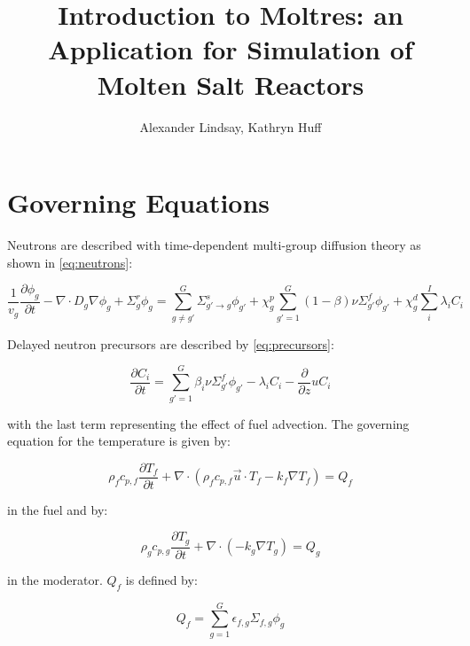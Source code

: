 \documentclass{article}
\title{Introduction to Moltres: an Application for Simulation of Molten Salt Reactors}
\author{Alexander Lindsay, Kathryn Huff}
\let\Oldsection\section
\renewcommand{\section}{\FloatBarrier\Oldsection}
\begin{document}
\maketitle

\section{Governing Equations}

Neutrons are described with time-dependent multi-group diffusion theory as shown
in \cref{eq:neutrons}:

\begin{equation}
\frac{1}{v_g}\frac{\partial \phi_g}{\partial t} - \nabla \cdot D_g \nabla \phi_g
+ \Sigma_g^r \phi_g = \sum_{g \ne g'}^G \Sigma_{g'\rightarrow g}^s \phi_{g'} + \chi_g^p \sum_{g' = 1}^G (1 - \beta)
\nu \Sigma_{g'}^f \phi_{g'} + \chi_g^d \sum_i^I \lambda_i C_i
\label{eq:neutrons}
\end{equation}

Delayed neutron precursors are described by \cref{eq:precursors}:

\begin{equation}
\frac{\partial C_i}{\partial t} = \sum_{g'= 1}^G \beta_i \nu \Sigma_{g'}^f
\phi_{g'} - \lambda_i C_i - \frac{\partial}{\partial z} u C_i
\label{eq:precursors}
\end{equation}

with the last term representing the effect of fuel advection. The governing
equation for the temperature is given by:

\begin{equation}
  \rho_fc_{p,f}\frac{\partial T_f}{\partial t} + \nabla\cdot\left(\rho_f c_{p,f}
  \vec{u}\cdot T_f -k_f\nabla T_f\right) =  Q_f
  \label{eq:fuel_temp}
\end{equation}

in the fuel and by:

\begin{equation}
  \rho_gc_{p,g}\frac{\partial T_g}{\partial t} + \nabla\cdot\left(-k_g\nabla T_g\right) =  Q_g
  \label{eq:moderator_temp}
\end{equation}

in the moderator. $Q_f$ is defined by:

\begin{equation}
  Q_f = \sum_{g=1}^G \epsilon_{f,g}\Sigma_{f,g}\phi_g
  \label{eq:fuel_source}
\end{equation}
\end{document}
